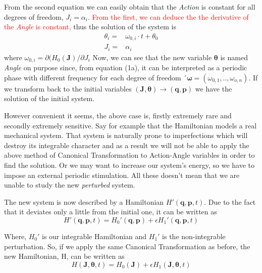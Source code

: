 	From the second equation we can easily obtain that the \textit{Action} is constant for all degrees of freedom, $J_i =\alpha_i$. \textcolor{red}{From the first, we can deduce the the derivative of the \textit{Angle} is constant,} thus the solution of the system is 
	\begin{subequations}\label{eq3}
		\begin{alignat}{2}
			\theta_i =& \omega_{0,i} \cdot t + \theta_0 \\ 
			J_i      =& \alpha_i
		\end{alignat}
	\end{subequations}
 	where $\omega_{0,i} = \partial(H_0(\bm{J})/\partial{J_i}$	
	Now, we can see that the new variable $\bm{\theta}$ is named \textit{Angle} on purpose since, from equation (1a), it can be interpreted as a periodic phase with different frequency for each degree of freedom ´$\bm{\omega} = (\omega_{0,1},..,\omega_{o,n})$.
	If we transform back to the initial variables $(\bm{J},\bm{\theta})\rightarrow(\bm{q},\bm{p})$ we have the solution of the initial system.
	
	However convenient it seems, the above case is, firstly extremely rare and secondly extremely sensitive. Say for example that the Hamiltonian models a real mechanical system. That system is naturally prone to imperfections which will destroy its integrable character and as a result we will not be able to apply the above method of Canonical Transformation to Action-Angle variables in order to find the solution. Or we may want to increase our system's energy, so we have to impose an external periodic stimulation.
	All these doesn't mean that we are unable to study the new \textit{perturbed} system.
	
	The new system is now described by a Hamiltonian $H'(\bm{q},\bm{p},t)$. Due to the fact that it deviates only a little from the initial one, it can be written as 
		\begin{equation}\label{eq4}
			H'(\bm{q},\bm{p},t) = H_0'(\bm{q},\bm{p}) + \epsilon H_1'(\bm{q},\bm{p},t) 
		\end{equation}
	
	Where, $H_0'$ is our integrable Hamiltonian and $H_1'$ is the non-integrable perturbation. So, if we apply the same Canonical Transformation as before, the new Hamiltonian, H, can be written as 
		\begin{equation}\label{eq5}
			H(\bm{J},\bm{\theta},t) = H_0(\bm{J}) + \epsilon H_1(\bm{J},\bm{\theta},t)
		\end{equation}
	
